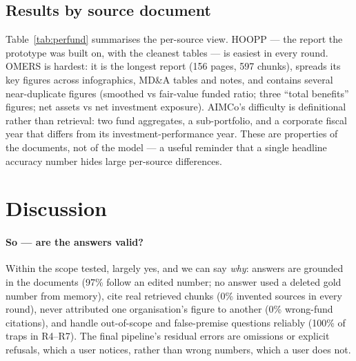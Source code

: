 \documentclass[11pt,a4paper]{article}
\begin{document}
\subsection{Results by source document}
\label{sec:bysource}
\begin{table}[H]
\centering\small
\caption{Accuracy (\%) on single-fund questions, by source report.}
\label{tab:perfund}

\end{table}
Table~\ref{tab:perfund} summarises the per-source view. HOOPP --- the report the prototype was built on, with the
cleanest tables --- is easiest in every round. OMERS is hardest: it is the longest report (156 pages, 597 chunks),
spreads its key figures across infographics, MD\&A tables and notes, and contains several near-duplicate figures
(smoothed vs fair-value funded ratio; three ``total benefits'' figures; net assets vs net investment exposure).
AIMCo's difficulty is definitional rather than retrieval: two fund aggregates, a sub-portfolio, and a corporate fiscal
year that differs from its investment-performance year. These are properties of the documents, not of the
model --- a useful reminder that a single headline accuracy number hides large per-source differences.

\section{Discussion}
\label{sec:discussion}

\paragraph{So --- are the answers valid?} Within the scope tested, largely yes, and we can say \emph{why}: answers are
grounded in the documents (97\% follow an edited number; no answer used a deleted gold number from memory), cite
real retrieved chunks (0\% invented sources in every round), never attributed one organisation's figure to another
(0\% wrong-fund citations), and handle out-of-scope and false-premise questions reliably (100\% of traps in R4--R7).
The final pipeline's residual errors are omissions or explicit refusals, which a user notices, rather than wrong
numbers, which a user does not.
\end{document}
